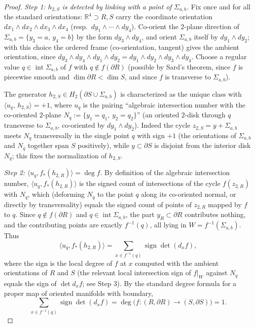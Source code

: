 \documentclass{amsart}
\newtheorem*{theorem 1}{Theorem 1}
\newtheorem*{theorem 2}{Theorem 2}
\newtheorem*{theorem 3}{Theorem 3}
\numberwithin{equation}{section}
\newcommand{\RR}{\mathbb{R}}
\begin{document}
\begin{proof}
\medskip
\noindent\emph{Step 1: $h_{2,S}$ is detected by linking with a point of $\Sigma_{a,b}$.}
Fix once and for all the standard orientations: $\RR^4\supset R,S$ carry the coordinate orientation $dx_1\wedge dx_2\wedge dx_3\wedge dx_4$ (resp.\ $dy_1\wedge\cdots\wedge dy_4$).  Co-orient the $2$-plane direction of $\Sigma_{a,b}=\{y_3=a,\,y_4=b\}$ by the form $dy_3\wedge dy_4$, and orient $\Sigma_{a,b}$ itself by $dy_1\wedge dy_2$; with this choice the ordered frame (co-orientation, tangent) gives the ambient orientation, since $dy_3\wedge dy_4\wedge dy_1\wedge dy_2 = dy_1\wedge dy_2\wedge dy_3\wedge dy_4$.  Choose a regular value $q\in\operatorname{int}\Sigma_{a,b}$ of $f$ with $q\notin f(\partial R)$ (possible by Sard's theorem, since $f$ is piecewise smooth and $\dim\partial R<\dim S$, and since $f$ is transverse to $\Sigma_{a,b}$).

The generator $h_{2,S}\in H_2(\partial S\cup\Sigma_{a,b})$ is characterized as the unique class with $\langle u_q,\,h_{2,S}\rangle = +1$, where $u_q$ is the pairing ``algebraic intersection number with the co-oriented $2$-plane $N_q := \{y_1 = q_1,\ y_2 = q_2\}$'' (an oriented $2$-disk through $q$ transverse to $\Sigma_{a,b}$, co-oriented by $dy_1\wedge dy_2$).  Indeed the cycle $z_{2,S}=y+\Sigma_{a,b}$ meets $N_q$ transversally in the single point $q$ with sign $+1$ (the orientations of $\Sigma_{a,b}$ and $N_q$ together span $S$ positively), while $y\subset\partial S$ is disjoint from the interior disk $N_q$; this fixes the normalization of $h_{2,S}$.

\medskip
\noindent\emph{Step 2: $\langle u_q, f_*(h_{2,R})\rangle = \deg f$.}
By definition of the algebraic intersection number, $\langle u_q, f_*(h_{2,R})\rangle$ is the signed count of intersections of the cycle $f(z_{2,R})$ with $N_q$, which (deforming $N_q$ to the point $q$ along its co-oriented normal, or directly by transversality) equals the signed count of points of $z_{2,R}$ mapped by $f$ to $q$.  Since $q\notin f(\partial R)$ and $q\in\operatorname{int}\Sigma_{a,b}$, the part $y_R\subset\partial R$ contributes nothing, and the contributing points are exactly $f^{-1}(q)$, all lying in $W=f^{-1}(\Sigma_{a,b})$.  Thus
$$ \langle u_q, f_*(h_{2,R})\rangle = \sum_{x\in f^{-1}(q)} \operatorname{sign}\det(d_xf), $$
where the sign is the local degree of $f$ at $x$ computed with the ambient orientations of $R$ and $S$ (the relevant local intersection sign of $f|_W$ against $N_q$ equals the sign of $\det d_xf$; see Step 3).  By the standard degree formula for a proper map of oriented manifolds with boundary,
$$ \sum_{x\in f^{-1}(q)}\operatorname{sign}\det(d_xf) = \deg\big(f:(R,\partial R)\to(S,\partial S)\big) = 1. $$


\end{proof}
\end{document}
